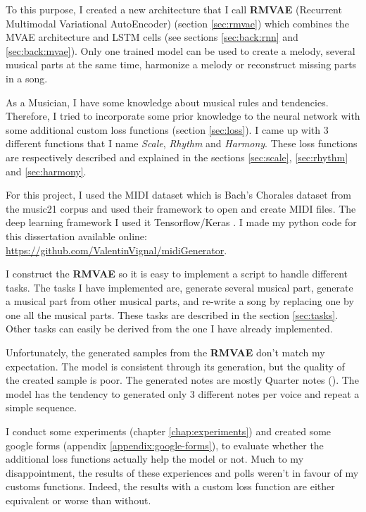 \documentclass[12pt]{report}
\begin{document}
To this purpose, I created a new architecture that I call \textbf{RMVAE} (Recurrent Multimodal Variational AutoEncoder) (section \ref{sec:rmvae}) which combines the MVAE architecture \cite{wu_multimodal_2018} and LSTM cells (see sections \ref{sec:back:rnn} and \ref{sec:back:mvae}).
Only one trained model can be used to create a melody, several musical parts at the same time, harmonize a melody or reconstruct missing parts in a song.

As a Musician, I have some knowledge about musical rules and tendencies.
Therefore, I tried to incorporate some prior knowledge to the neural network with some additional custom loss functions (section \ref{sec:loss}).
I came up with 3 different functions that I name \textit{Scale}, \textit{Rhythm} and \textit{Harmony}.
These loss functions are respectively described and explained in the sections \ref{sec:scale}, \ref{sec:rhythm} and \ref{sec:harmony}.

For this project, I used the MIDI dataset which is Bach's Chorales dataset from the music21 corpus \cite{noauthor_music21corpuschorales_nodate} and used their framework \cite{noauthor_music21_nodate} to open and create MIDI files.
The deep learning framework I used it Tensorflow/Keras \cite{noauthor_tensorflow_nodate, noauthor_keras_nodate}.
I made my python code for this dissertation available online: \url{https://github.com/ValentinVignal/midiGenerator}.

I construct the \textbf{RMVAE} so it is easy to implement a script to handle different tasks.
The tasks I have implemented are, generate several musical part, generate a musical part from other musical parts, and re-write a song by replacing one by one all the musical parts.
These tasks are described in the section \ref{sec:tasks}.
Other tasks can easily be derived from the one I have already implemented.

Unfortunately, the generated samples from the \textbf{RMVAE} don't match my expectation.
The model is consistent through its generation, but the quality of the created sample is poor.
The generated notes are mostly Quarter notes (\musQuarter).
The model has the tendency to generated only 3 different notes per voice and repeat a simple sequence.

I conduct some experiments (chapter \ref{chap:experiments}) and created some google forms (appendix \ref{appendix:google-forms}), to evaluate whether the additional loss functions actually help the model or not.
Much to my disappointment, the results of these experiences and polls weren't in favour of my customs functions.
Indeed, the results with a custom loss function are either equivalent or worse than without.
\end{document}
